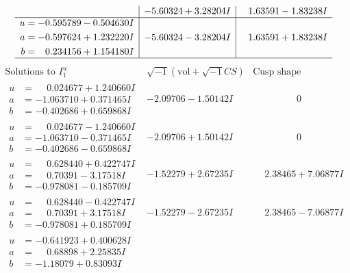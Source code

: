 \documentclass[1p]{elsarticle_modified}
\theoremstyle{definition}
\newcommand{\I}{\sqrt{-1}}
\begin{document}
$$\begin{array}{c|c|c}
 & -5.60324 + 3.28204 I & \phantom{-}1.63591 - 1.83238 I \\ \hline\begin{aligned}
u &= -0.595789 - 0.504630 I \\
a &= -0.597624 + 1.232220 I \\
b &= \phantom{-}0.234156 + 1.154180 I\end{aligned}
 & -5.60324 - 3.28204 I & \phantom{-}1.63591 + 1.83238 I\\
 \hline 
 \end{array}$$\newpage$$\begin{array}{c|c|c}  
\text{Solutions to }I^u_{1}& \I (\text{vol} + \sqrt{-1}CS) & \text{Cusp shape}\\
 \hline 
\begin{aligned}
u &= \phantom{-}0.024677 + 1.240660 I \\
a &= -1.063710 + 0.371465 I \\
b &= -0.402686 + 0.659868 I\end{aligned}
 & -2.09706 - 1.50142 I & \phantom{-0.000000 } 0 \\ \hline\begin{aligned}
u &= \phantom{-}0.024677 - 1.240660 I \\
a &= -1.063710 - 0.371465 I \\
b &= -0.402686 - 0.659868 I\end{aligned}
 & -2.09706 + 1.50142 I & \phantom{-0.000000 } 0 \\ \hline\begin{aligned}
u &= \phantom{-}0.628440 + 0.422747 I \\
a &= \phantom{-}0.70391 - 3.17518 I \\
b &= -0.978081 - 0.185709 I\end{aligned}
 & -1.52279 + 2.67235 I & \phantom{-}2.38465 + 7.06877 I \\ \hline\begin{aligned}
u &= \phantom{-}0.628440 - 0.422747 I \\
a &= \phantom{-}0.70391 + 3.17518 I \\
b &= -0.978081 + 0.185709 I\end{aligned}
 & -1.52279 - 2.67235 I & \phantom{-}2.38465 - 7.06877 I \\ \hline\begin{aligned}
u &= -0.641923 + 0.400628 I \\
a &= \phantom{-}0.68898 + 2.25835 I \\
b &= -1.18079 + 0.83093 I\end{aligned}

\end{array}$$
\end{document}
